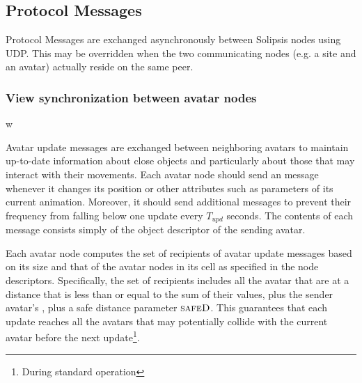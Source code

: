 \subsection{Protocol Messages}
Protocol Messages are exchanged asynchronously between Solipsis nodes
using UDP. This may be overridden when the two communicating nodes (e.g. a
site and an avatar) actually reside on the same peer. 



\subsubsection{View synchronization between avatar nodes}

\msgentry{\avupda}
w
\desc

Avatar update messages are exchanged between neighboring avatars to
maintain up-to-date information about close objects and particularly
about those that may interact with their movements. Each avatar node
should send an \avupda message whenever it changes its position or
other attributes such as parameters of its current
animation. Moreover, it should send additional \avupda messages to
prevent their frequency from falling below one update every $T_{upd}$
seconds. The contents of each \avupda message consists simply of the
object descriptor of the sending avatar.

Each avatar node computes the set of recipients of avatar update
messages based on its size and that of the avatar nodes in its cell as
specified in the node descriptors. Specifically, the set of recipients
includes all the avatar that are at a distance that is less than or
equal to the sum of their \bRadius values, plus the sender avatar's
\bRadius, plus a safe distance parameter $\textsc{safeD}$. This guarantees
that each update reaches all the avatars that may potentially collide
with the current avatar before the next update\footnote{During
  standard operation}.



